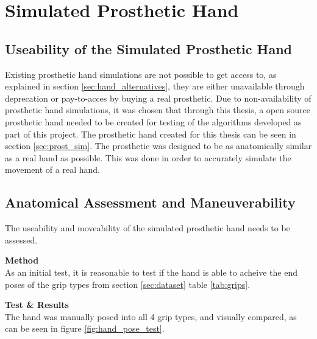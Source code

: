 \documentclass[../main.tex]{subfiles}
\begin{document}



\section{Simulated Prosthetic Hand}

\subsection{Useability of the Simulated Prosthetic Hand}

Existing prosthetic hand simulations are not possible to get access to, as explained in section \ref{sec:hand_alternatives}, they are either unavailable through deprecation or pay-to-acces by buying a real prosthetic.
Due to non-availability of prosthetic hand simulations, it was chosen that through this thesis, a open source prosthetic hand needed to be created for testing of the algorithms developed as part of this project.
The prosthetic hand created for this thesis can be seen in section \ref{sec:prost_sim}.
The prosthetic was designed to be as anatomically similar as a real hand as possible.
This was done in order to accurately simulate the movement of a real hand.

\subsection{Anatomical Assessment and Maneuverability}

The useability and moveability of the simulated prosthetic hand needs to be assessed.

\textbf{Method}\\
As an initial test, it is reasonable to test if the hand is able to acheive the end poses of the grip types from section \ref{sec:dataset} table \ref{tab:grips}. 

\textbf{Test \& Results}\\

The hand was manually posed into all 4 grip types, and visually compared, as can be seen in figure  \ref{fig:hand_pose_test}.
\end{document}
